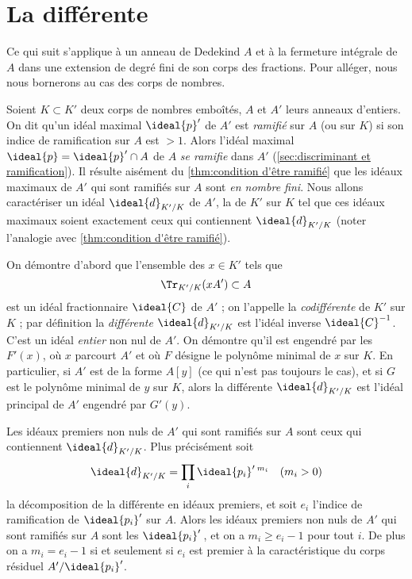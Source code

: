 \documentclass[11pt, %
  title in boldface,
  theorem in new line,
  theorem numbering = section,
  number theorems separately,
  simple name,
]{beaulivre}
\begin{document}
\section*{La différente}

    Ce qui suit s'applique à un anneau de Dedekind \( A \) et à la fermeture intégrale de \( A \) dans une extension de degré fini de son corps des fractions. Pour alléger, nous nous bornerons au cas des corps de nombres.

    Soient \( K \subset K' \) deux corps de nombres emboîtés, \( A \) et \( A' \) leurs anneaux d'entiers. On dit qu'un idéal maximal \( \ideal{p}' \) de \( A' \) est \emph{ramifié} sur \( A \) (ou sur \( K \)) si son indice de ramification sur \( A \) est \( > 1 \). Alors l'idéal maximal \( \ideal{p} = \ideal{p}' \cap A \) de \( A \) \emph{se ramifie} dans \( A' \) (\cref{sec:discriminant et ramification}). Il résulte aisément du \cref{thm:condition d'être ramifié} que les idéaux maximaux de \( A' \) qui sont ramifiés sur \( A \) sont \emph{en nombre fini}. Nous allons caractériser un idéal \( \ideal{d}_{K'/K} \) de \( A' \), la  de \( K' \) sur \( K \) tel que ces idéaux maximaux soient exactement ceux qui contiennent \( \ideal{d}_{K'/K} \) (noter l'analogie avec \cref{thm:condition d'être ramifié}).

    On démontre d'abord que l'ensemble des \( x \in K' \) tels que
    \begin{equation}
        \Tr_{K'/K}(xA') \subset A
    \end{equation}
    est un idéal fractionnaire \( \ideal{C} \) de \( A' \) ; on l'appelle la \emph{codifférente} de \( K' \) sur \( K \) ; par définition la \emph{différente} \( \ideal{d}_{K'/K} \) est l'idéal inverse \( \ideal{C}^{-1} \). C'est un idéal \emph{entier} non nul de \( A' \). On démontre qu'il est engendré par les \( F'(x) \), où \( x \) parcourt \( A' \) et où \( F \) désigne le polynôme minimal de \( x \) sur \( K \). En particulier, si \( A' \) est de la forme \( A[y] \) (ce qui n'est pas toujours le cas), et si \( G \) est le polynôme minimal de \( y \) sur \( K \), alors la différente \( \ideal{d}_{K'/K} \) est l'idéal principal de \( A' \) engendré par \( G'(y) \).

    Les idéaux premiers non nuls de \( A' \) qui sont ramifiés sur \( A \) sont ceux qui contiennent \( \ideal{d}_{K'/K} \). Plus précisément soit
    \begin{equation}
        \ideal{d}_{K'/K} = \prod_i \ideal{p_i}'\,{}^{m_i} \quad \text{(\( m_i > 0 \))}
    \end{equation}
    la décomposition de la différente en idéaux premiers, et soit \( e_i \) l'indice de ramification de \( \ideal{p_i}' \) sur \( A \). Alors les idéaux premiers non nuls de \( A' \) qui sont ramifiés sur \( A \) sont les \( \ideal{p_i}' \)\,, et on a \( m_i \geqslant e_i - 1 \) pour tout \( i \). De plus on a \( m_i = e_i - 1 \) si et seulement si \( e_i \) est premier à la caractéristique du corps résiduel \( A'/\ideal{p_i}' \).
\end{document}
